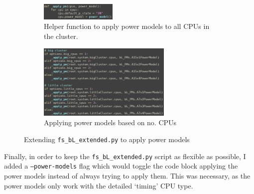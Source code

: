     \begin{figure}[H]
        \centering
        \begin{subfigure}{0.9\linewidth}
            \centering
            \includegraphics[width=0.4\textwidth]{screenshots/config-exts/def-apply-pm.png}
            \caption{Helper function to apply power models to all CPUs in the 
                     cluster.}
        \end{subfigure}
        \begin{subfigure}{0.9\linewidth}
            \centering
            \includegraphics[width=0.7\textwidth]{screenshots/config-exts/apply-power-models.png}
            \caption{Applying power models based on no. CPUs}
        \end{subfigure}
        \caption{Extending \texttt{fs\_bL\_extended.py} to apply power models}
    \end{figure}
    Finally, in order to keep the \texttt{fs\_bL\_extended.py} script as 
    flexible as possible, I added a \texttt{--power-models} flag which would 
    toggle the code block applying the power models instead of always trying to
    apply them. This was necessary, as the power models only work with the 
    detailed `timing' CPU type.
    
